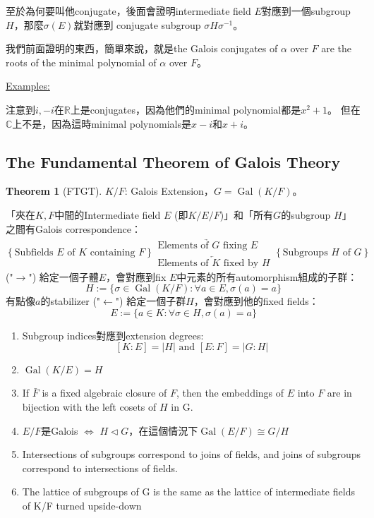 \documentclass[12pt]{article}
\theoremstyle{definition}
\newtheorem{thm}{Theorem}
\newcommand{\ex}{\noindent\underline{Examples:}}
\newcommand{\CC}{\mathbb C}
\newcommand{\RR}{\mathbb R}
\DeclareMathOperator{\Gal}{Gal}
\begin{document}
至於為何要叫他conjugate，後面會證明intermediate field $E$對應到一個subgroup $H$，那麼$\sigma(E)$就對應到
conjugate subgroup $\sigma H \sigma^{-1}$。

我們前面證明的東西，簡單來說，就是the Galois conjugates of $\alpha$ over $F$ are the roots of
the minimal polynomial of $\alpha$ over $F$。

\ex

注意到$i,-i$在$\RR$上是conjugates，因為他們的minimal polynomial都是$x^2+1$。
但在$\CC$上不是，因為這時minimal polynomials是$x-i$和$x+i$。

\clearpage
\subsection{The Fundamental Theorem of Galois Theory}

\begin{thm}[FTGT]\leavevmode
	$K/F$: Galois Extension，$G=\Gal(K/F)$。

	「夾在$K,F$中間的Intermediate field $E$ (即$K/E/F$)」和「所有$G$的subgroup $H$」之間有Galois correspondence：
	\[
		\left\{\text{Subfields $E$ of $K$ containing $F$}\right\}
		\begin{matrix}
			\underrightarrow{\text{Elements of $G$ fixing $E$}} \\
			\underleftarrow{\text{Elements of $K$ fixed by $H$}}
		\end{matrix}
		\left\{\text{Subgroups $H$ of $G$}\right\}
	\]
	\noindent ("$\rightarrow$") 給定一個子體$E$，會對應到fix $E$中元素的所有automorphism組成的子群：
	\[H:=\{\sigma\in\Gal(K/F): \forall a \in E, \sigma(a)=a\}\]
	有點像$a$的stabilizer
	\noindent ("$\leftarrow$") 給定一個子群$H$，會對應到他的fixed fields：
	\[E:=\{a\in K: \forall \sigma\in H, \sigma(a)=a\}\]
	\begin{enumerate}
		\item Subgroup indices對應到extension degrees:
		      \[[K:E]=|H|\text{ and }[E:F]=|G:H|\]
		\item $\Gal(K/E)=H$
		\item If $\bar{F}$ is a fixed algebraic closure of $F$, then the embeddings of $E$ into
		      $F$ are in bijection with the left cosets of $H$ in G.
		\item $E/F$是Galois $\iff$ $H\lhd G$，在這個情況下$\Gal(E/F)\cong G/H$
		\item  Intersections of subgroups correspond to joins of fields, and joins of
		      subgroups correspond to intersections of fields.
		\item  The lattice of subgroups of G is the same as the lattice of
		      intermediate fields of K/F turned upside-down
	\end{enumerate}
\end{thm}
\end{document}
